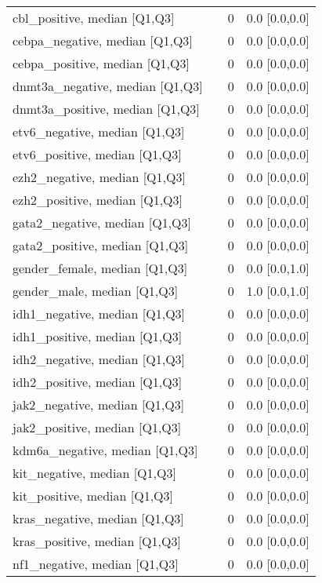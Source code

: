 \begin{tabular}{llll}
cbl\_positive, median [Q1,Q3] &    &      0 &     0.0 [0.0,0.0] \\
cebpa\_negative, median [Q1,Q3] &    &      0 &     0.0 [0.0,0.0] \\
cebpa\_positive, median [Q1,Q3] &    &      0 &     0.0 [0.0,0.0] \\
dnmt3a\_negative, median [Q1,Q3] &    &      0 &     0.0 [0.0,0.0] \\
dnmt3a\_positive, median [Q1,Q3] &    &      0 &     0.0 [0.0,0.0] \\
etv6\_negative, median [Q1,Q3] &    &      0 &     0.0 [0.0,0.0] \\
etv6\_positive, median [Q1,Q3] &    &      0 &     0.0 [0.0,0.0] \\
ezh2\_negative, median [Q1,Q3] &    &      0 &     0.0 [0.0,0.0] \\
ezh2\_positive, median [Q1,Q3] &    &      0 &     0.0 [0.0,0.0] \\
gata2\_negative, median [Q1,Q3] &    &      0 &     0.0 [0.0,0.0] \\
gata2\_positive, median [Q1,Q3] &    &      0 &     0.0 [0.0,0.0] \\
gender\_female, median [Q1,Q3] &    &      0 &     0.0 [0.0,1.0] \\
gender\_male, median [Q1,Q3] &    &      0 &     1.0 [0.0,1.0] \\
idh1\_negative, median [Q1,Q3] &    &      0 &     0.0 [0.0,0.0] \\
idh1\_positive, median [Q1,Q3] &    &      0 &     0.0 [0.0,0.0] \\
idh2\_negative, median [Q1,Q3] &    &      0 &     0.0 [0.0,0.0] \\
idh2\_positive, median [Q1,Q3] &    &      0 &     0.0 [0.0,0.0] \\
jak2\_negative, median [Q1,Q3] &    &      0 &     0.0 [0.0,0.0] \\
jak2\_positive, median [Q1,Q3] &    &      0 &     0.0 [0.0,0.0] \\
kdm6a\_negative, median [Q1,Q3] &    &      0 &     0.0 [0.0,0.0] \\
kit\_negative, median [Q1,Q3] &    &      0 &     0.0 [0.0,0.0] \\
kit\_positive, median [Q1,Q3] &    &      0 &     0.0 [0.0,0.0] \\
kras\_negative, median [Q1,Q3] &    &      0 &     0.0 [0.0,0.0] \\
kras\_positive, median [Q1,Q3] &    &      0 &     0.0 [0.0,0.0] \\
nf1\_negative, median [Q1,Q3] &    &      0 &     0.0 [0.0,0.0] \\

\end{tabular}
